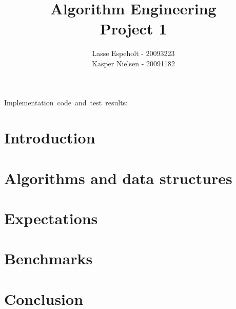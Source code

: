 \documentclass[a4paper]{article}
\begin{document}
\title{Algorithm Engineering\\Project 1}

\author{Lasse Espeholt - 20093223\\
Kasper Nielsen - 20091182}

\maketitle
\vfill{}

\begin{description}
\item [{Implementation~code~and~test~results:}] 
\end{description}
\pagebreak{}\tableofcontents{}\pagebreak{}

\section{Introduction}


	
\section{Algorithms and data structures}



\section{Expectations}



\section{Benchmarks}



\section{Conclusion}


\end{document}
